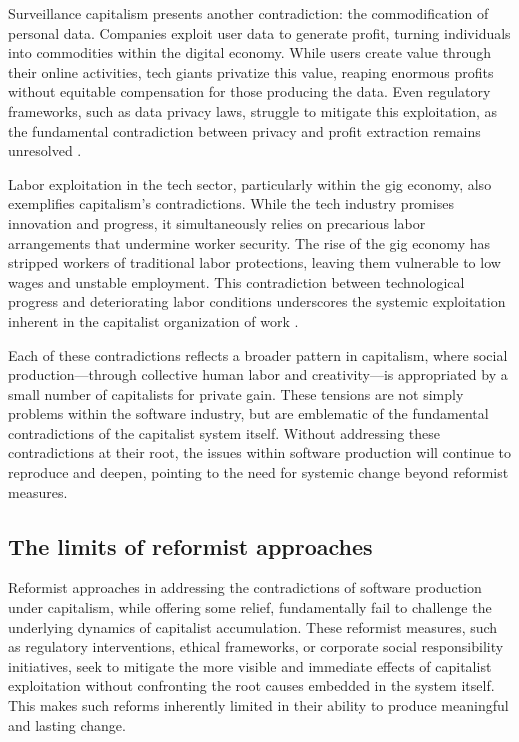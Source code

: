 Surveillance capitalism presents another contradiction: the commodification of personal data. Companies exploit user data to generate profit, turning individuals into commodities within the digital economy. While users create value through their online activities, tech giants privatize this value, reaping enormous profits without equitable compensation for those producing the data. Even regulatory frameworks, such as data privacy laws, struggle to mitigate this exploitation, as the fundamental contradiction between privacy and profit extraction remains unresolved \cite[pp.~111-113]{zuboff2020}.

Labor exploitation in the tech sector, particularly within the gig economy, also exemplifies capitalism’s contradictions. While the tech industry promises innovation and progress, it simultaneously relies on precarious labor arrangements that undermine worker security. The rise of the gig economy has stripped workers of traditional labor protections, leaving them vulnerable to low wages and unstable employment. This contradiction between technological progress and deteriorating labor conditions underscores the systemic exploitation inherent in the capitalist organization of work \cite[pp.~145-148]{scholz2017}.

Each of these contradictions reflects a broader pattern in capitalism, where social production—through collective human labor and creativity—is appropriated by a small number of capitalists for private gain. These tensions are not simply problems within the software industry, but are emblematic of the fundamental contradictions of the capitalist system itself. Without addressing these contradictions at their root, the issues within software production will continue to reproduce and deepen, pointing to the need for systemic change beyond reformist measures.

\subsection{The limits of reformist approaches}

Reformist approaches in addressing the contradictions of software production under capitalism, while offering some relief, fundamentally fail to challenge the underlying dynamics of capitalist accumulation. These reformist measures, such as regulatory interventions, ethical frameworks, or corporate social responsibility initiatives, seek to mitigate the more visible and immediate effects of capitalist exploitation without confronting the root causes embedded in the system itself. This makes such reforms inherently limited in their ability to produce meaningful and lasting change.

